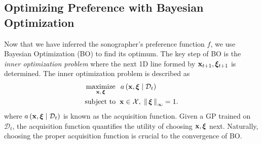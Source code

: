

\subsection{Optimizing Preference with Bayesian Optimization}\label{section:bo}
Now that we have inferred the sonographer's preference function \(f\), we use Bayesian Optimization (BO) to find its optimum.
The key step of BO is the \textit{inner optimization problem} where the next 1D line formed by \(\mathbf{x}_{t+1}, \bm{\xi}_{t+1}\) is determined.
The inner optimization problem is described as
%
\begin{align}
 &\operatorname*{maximize}_{\mathbf{x},\, \bm{\xi}}\;\; a\,(\mathbf{x}, \bm{\xi} \mid \mathcal{D}_t) \\
 &\text{subject to}\;\; \mathbf{x} \in \mathcal{X},\; \left\lVert\, \bm{\xi} \,\right\rVert_{\infty} = 1.\nonumber
\end{align}
where \(a\,(\mathbf{x}, \bm{\xi} \mid \mathcal{D}_t)\) is known as the acquisition function.
Given a GP trained on \(\mathcal{D}_t\), the acquisition function quantifies the utility of choosing \(\mathbf{x}, \bm{\xi}\) next.
Naturally, choosing the proper acquisition function is crucial to the convergence of BO.


